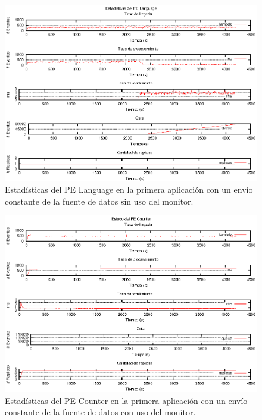 \begin{figure}[p]
\centering
    \includegraphics[scale=1.1]{images/exp/app1/uniform/sm/statusLanguagePE.eps}
    \caption{Estadísticas del PE Language en la primera aplicación con un envío constante de la fuente de datos sin uso del monitor.}
    \label{fig:app1-uniform-statusLanguagePE-sm}
\end{figure}

\begin{figure}[p]
\centering
    \includegraphics[scale=1.1]{images/exp/app1/uniform/cm/statusCounterPE.eps}
    \caption{Estadísticas del PE Counter en la primera aplicación con un envío constante de la fuente de datos con uso del monitor.}
    \label{fig:app1-uniform-statusCounterPE-cm}
\end{figure}

